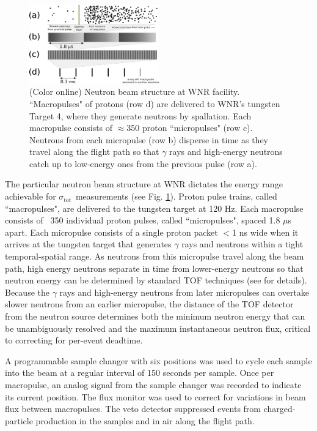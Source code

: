 \documentclass[twocolumn,secnumarabic,amssymb, nobibnotes, aps, prl,
superscriptaddress, nobalancelastpage]{revtex4}
\newcommand{\tot}{\ensuremath{\sigma_{tot}}}
\begin{document}
\begin{figure}
    \includegraphics[width=0.5\textwidth]{figures/beamStructure.png}
    \caption{(Color online) Neutron beam structure at WNR facility.
        ``Macropulses" of protons (row d) are delivered to
        WNR's tungsten Target 4, where they generate neutrons by spallation.
        Each macropulse consists of
        $\approx$350 proton ``micropulses" (row c). Neutrons
        from each micropulse (row b) disperse in
        time as they travel along the flight path so that $\gamma$ rays and high-energy 
    neutrons catch up to low-energy ones from the previous pulse (row a).}
    \label{BeamStructure}
\end{figure}

The particular neutron beam structure at WNR dictates the energy range
achievable for \tot\ measurements (see Fig. \ref{BeamStructure}).
Proton pulse trains, called ``macropulses", are delivered to the tungsten target at 120 Hz.
Each macropulse consists of ~350 individual proton pulses, called ``micropulses", spaced 1.8 
$\mu$s apart. Each micropulse consists of a single proton packet $<$1 ns wide when it 
arrives at the tungsten target that generates $\gamma$ rays and neutrons within a tight
temporal-spatial range. As neutrons from this micropulse travel along the beam path, 
high energy neutrons separate in time from lower-energy neutrons so that neutron
energy can be determined by standard TOF techniques (see \cite{Moore1980} for details).
Because the $\gamma$ rays and high-energy neutrons from later micropulses can
overtake slower neutrons from an earlier micropulse, the distance of the TOF
detector from the neutron source determines both the minimum neutron energy that can be 
unambiguously resolved and the maximum instantaneous neutron flux, critical to correcting
for per-event deadtime.

A programmable sample changer with six positions
was used to cycle each sample into the beam at a regular interval of 150 seconds 
per sample. Once per macropulse, an analog signal from the sample changer
was recorded to indicate its current position.
The flux monitor was used to correct for variations in beam flux between 
macropulses. The veto detector suppressed events from charged-particle production 
in the samples and in air along the flight path.
\end{document}

